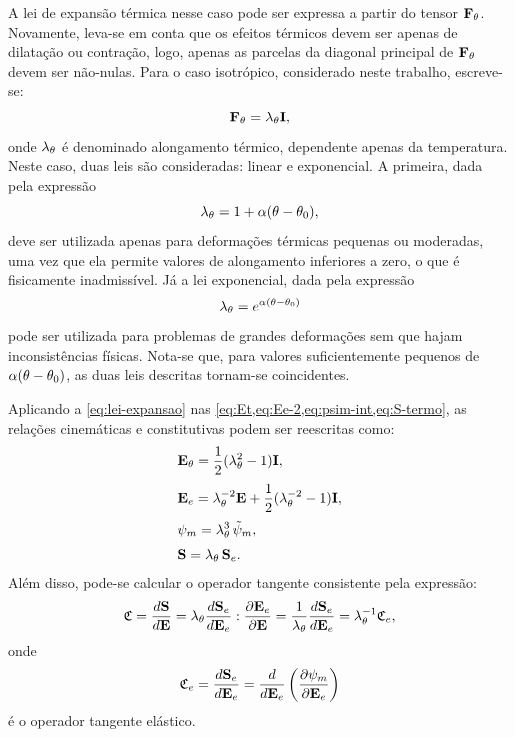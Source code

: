 \documentclass[Tese.tex]{subfiles}
\begin{document}
A lei de expansão térmica nesse caso pode ser expressa a partir do tensor $\mathbf{F}_{\theta}$. Novamente, leva-se em conta que os efeitos térmicos devem ser apenas de dilatação ou contração, logo, apenas as parcelas da diagonal principal de $\mathbf{F}_{\theta}$ devem ser não-nulas. Para o caso isotrópico, considerado neste trabalho, escreve-se:
\begin{equation}\label{eq:lei-expansao}
\mathbf{F}_{\theta} = \lambda_{\theta}\mathbf{I},
\end{equation}
onde $\lambda_{\theta}$ é denominado alongamento térmico, dependente apenas da temperatura. Neste caso, duas leis são consideradas: linear e exponencial. A primeira, dada pela expressão
\begin{equation}\label{eq:expansao-linear-2}
\lambda_{\theta} = 1 + \alpha(\theta-\theta_0),
\end{equation}
deve ser utilizada apenas para deformações térmicas pequenas ou moderadas, uma vez que ela permite valores de alongamento inferiores a zero, o que é fisicamente inadmissível. Já a lei exponencial, dada pela expressão
\begin{equation}\label{eq:expansao-exp}
\lambda_{\theta} = e^{\alpha(\theta-\theta_0)}
\end{equation}
pode ser utilizada para problemas de grandes deformações sem que hajam inconsistências físicas. Nota-se que, para valores suficientemente pequenos de $\alpha(\theta-\theta_0)$, as duas leis descritas tornam-se coincidentes.

Aplicando a \cref{eq:lei-expansao} nas \cref{eq:Et,eq:Ee-2,eq:psim-int,eq:S-termo}, as relações cinemáticas e constitutivas podem ser reescritas como:
\begin{align}
&\mathbf{E}_{\theta} = \dfrac{1}{2}(\lambda_{\theta}^2-1)\mathbf{I} ,\label{eq:Et-isotropico}\\[0.1cm]
&\mathbf{E}_e = \lambda_{\theta}^{-2}\mathbf{E}+\dfrac{1}{2}(\lambda_{\theta}^{-2}-1)\mathbf{I} ,\label{eq:Ee-termo-iso}\\[0.1cm]
&\psi_m = \lambda_{\theta}^3\,\tilde{\psi}_m, \\[0.1cm]
&\mathbf{S} = \lambda_{\theta}\,\mathbf{S}_e.
\end{align}
Além disso, pode-se calcular o operador tangente consistente pela expressão:
\begin{equation}
\mathfrak{C} = \dfrac{d\mathbf{S}}{d\mathbf{E}} = \lambda_{\theta}\dfrac{d\mathbf{S}_e}{d\mathbf{E}_e}:\dfrac{\partial\mathbf{E}_e}{\partial\mathbf{E}}=\dfrac{1}{\lambda_{\theta}}\dfrac{d\mathbf{S}_e}{d\mathbf{E}_e} = \lambda_{\theta}^{-1}\mathfrak{C}_e,
\end{equation}
onde
\begin{equation}
\mathfrak{C}_e = \dfrac{d \mathbf{S}_e}{d \mathbf{E}_e} = \dfrac{d}{d\mathbf{E}_e}\left(\dfrac{\partial \psi_m}{\partial\mathbf{E}_e}\right)
\end{equation}
é o operador tangente elástico.
\end{document}
